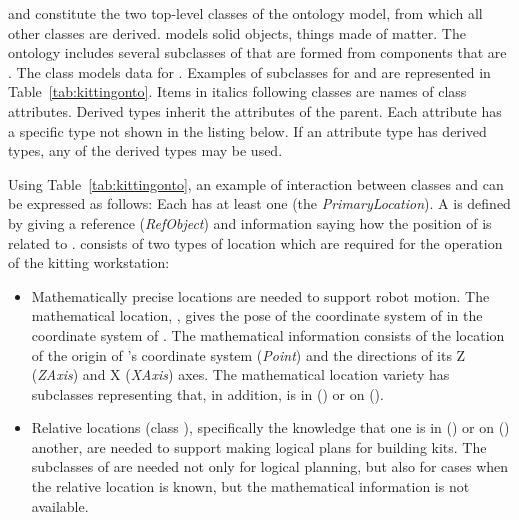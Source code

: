  and  constitute the two top-level classes of the  ontology model, from which all other classes are derived.  models solid objects, things made of matter. The  ontology includes several subclasses of  that are formed from
components that are . The  class models data for . Examples of subclasses for  and  are represented in Table~\ref{tab:kittingonto}. Items in italics following classes are names of class attributes. Derived types inherit the attributes of the parent. Each attribute has a specific type not shown in the listing below. If an attribute type has derived types, any of the derived types may be used.

Using Table~\ref{tab:kittingonto}, an example of interaction between classes  and  can be expressed as follows: Each   has at least one  (the \textit{PrimaryLocation}). A  is defined by giving a reference   (\textit{RefObject}) and information saying how the position of  is related to .  consists of two types of location which are required for the operation of the kitting workstation:
\begin{itemize}
 \item Mathematically precise locations are needed to support robot motion. The mathematical location, , gives the pose of the coordinate system of  in the coordinate system of . The mathematical information consists of the location of the origin of 's coordinate system (\textit{Point}) and the directions of its Z (\textit{ZAxis}) and X (\textit{XAxis}) axes. The mathematical location variety has subclasses representing that, in addition,  is in  () or on  ().
\item Relative locations (class ), specifically the knowledge that one  is in () or on () another, are needed to support making logical plans for building kits. The subclasses of  are needed not only for
logical planning, but also for cases when the relative location is known, but the
mathematical information is not available.
\end{itemize}


